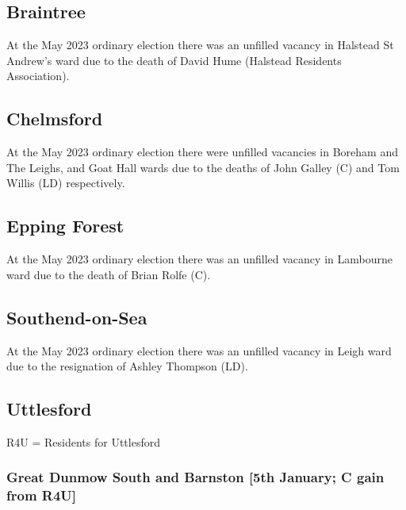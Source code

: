 \documentclass[a4paper,openany]{book}
\begin{document}
\begin{resultsiii}
\subsection*{Braintree}

At the May 2023 ordinary election there was an unfilled vacancy in Halstead St Andrew's ward due to the death of David Hume (Halstead Residents Association).%

\subsection*{Chelmsford}

At the May 2023 ordinary election there were unfilled vacancies in Boreham and The Leighs, and Goat Hall wards due to the deaths of John Galley (C) and Tom Willis (LD) respectively.%
%

\subsection*{Epping Forest}

At the May 2023 ordinary election there was an unfilled vacancy in Lambourne ward due to the death of Brian Rolfe (C).%

\subsection*{Southend-on-Sea}

At the May 2023 ordinary election there was an unfilled vacancy in Leigh ward due to the resignation of Ashley Thompson (LD).%

\subsection*{Uttlesford}

R4U = Residents for Uttlesford

\subsubsection*{Great Dunmow South and Barnston \hspace*{\fill}\nolinebreak[1]%
	\enspace\hspace*{\fill}
	[5th January; C gain from R4U]}


\end{resultsiii}
\end{document}
